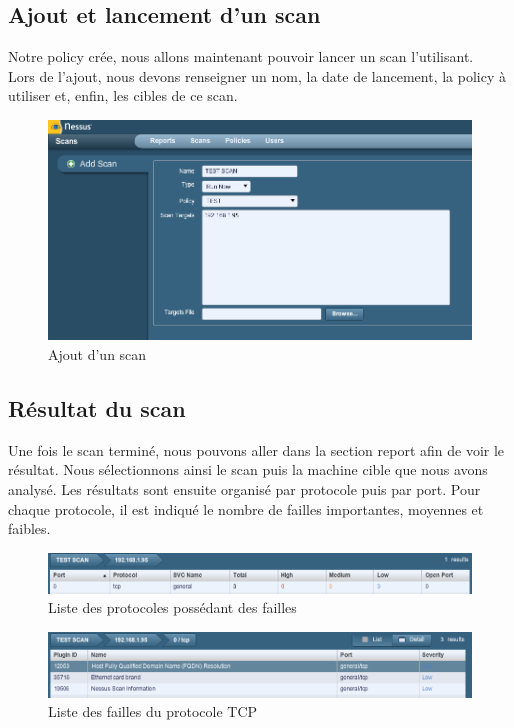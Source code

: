 \documentclass[a4paper,12pt]{article}
\begin{document}
\subsection{Ajout et lancement d'un scan}
Notre policy crée, nous allons maintenant pouvoir lancer un scan l'utilisant.\\
Lors de l'ajout, nous devons renseigner un nom, la date de lancement, la policy à utiliser et, enfin, les cibles de ce scan.

\begin{figure}[H]
	\center
	\includegraphics[width=15cm]{img/nessus_scan.png}
	\caption{Ajout d'un scan}
\end{figure}

\subsection{Résultat du scan}
Une fois le scan terminé, nous pouvons aller dans la section report afin de voir le résultat. Nous sélectionnons ainsi le scan
puis la machine cible que nous avons analysé. Les résultats sont ensuite organisé par protocole puis par port. Pour chaque protocole,
il est indiqué le nombre de failles importantes, moyennes et faibles.

\begin{figure}[H]
	\center
	\includegraphics[width=15cm]{img/nessus_scan_protocole.png}
	\caption{Liste des protocoles possédant des failles}
\end{figure}

\begin{figure}[H]
	\center
	\includegraphics[width=15cm]{img/nessus_scan_tcp.png}
	\caption{Liste des failles du protocole TCP}
\end{figure}
\end{document}
